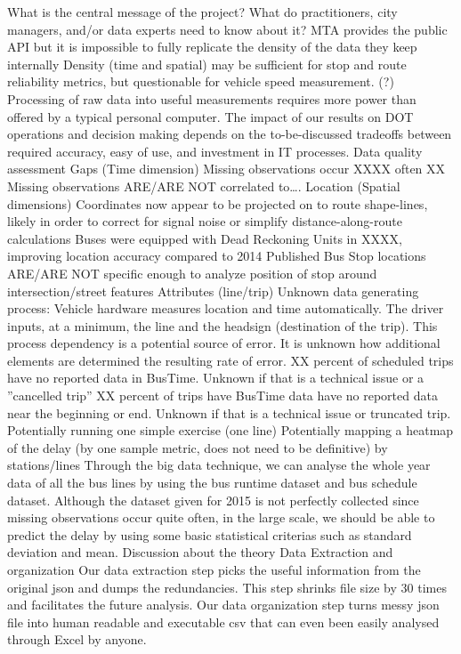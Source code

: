 \documentclass[12pt]{report}
\begin{document}
What is the central message of the project? What do practitioners, city managers, and/or data experts need to know about it?
MTA provides the public API but it is impossible to fully replicate the density of the data they keep internally
Density (time and spatial) may be sufficient for stop and route reliability metrics, but questionable for vehicle speed measurement. (?)
Processing of raw data into useful measurements requires more power than offered by a typical personal computer.
The impact of our results on DOT operations and decision making depends on the to-be-discussed tradeoffs between required accuracy, easy of use, and investment in IT processes. 
Data quality assessment 
Gaps (Time dimension)
Missing observations occur XXXX often
XX%
Missing observations ARE/ARE NOT correlated to….
Location (Spatial dimensions)
Coordinates now appear to be projected on to route shape-lines, likely in order to correct for signal noise or simplify distance-along-route calculations
Buses were equipped with Dead Reckoning Units in XXXX, improving location accuracy compared to 2014
Published Bus Stop locations ARE/ARE NOT specific enough to analyze position of stop around intersection/street features
Attributes (line/trip)
Unknown data generating process: Vehicle hardware measures location and time automatically.  The driver inputs, at a minimum, the line and the headsign (destination of the trip).  This process dependency is a potential source of error. It is unknown how additional elements are determined the resulting rate of error.
XX percent of scheduled trips have no reported data in BusTime.  Unknown if that is a technical issue or a ''cancelled trip''
XX percent of trips have BusTime data have no reported data near the beginning or end. Unknown if that is a technical issue or truncated trip.
Potentially running one simple exercise (one line)
Potentially mapping a heatmap of the delay (by one sample metric, does not need to be definitive) by stations/lines
Through the big data technique, we can analyse the whole year data of all the bus lines by using the bus runtime dataset and bus schedule dataset.
Although the dataset given for 2015 is not perfectly collected since missing observations occur quite often, in the large scale, we should be able to predict the delay by using some basic statistical criterias such as standard deviation and mean.
Discussion about the theory
Data Extraction and organization
Our data extraction step picks the useful information from the original json and dumps the redundancies. This step shrinks file size by 30 times and facilitates the future analysis.
Our data organization step turns messy json file into human readable and executable csv that can even been easily analysed through Excel by anyone.
\end{document}
